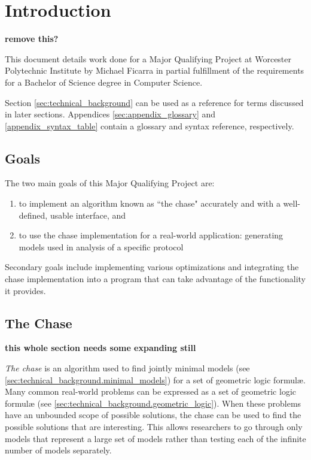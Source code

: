 \section{Introduction}

	\textbf{ remove this? }

	This document details work done for a Major Qualifying Project at Worcester
	Polytechnic Institute by Michael Ficarra in partial fulfillment of the
	requirements for a Bachelor of Science degree in Computer Science.

	Section \ref{sec:technical_background} can be used as a reference for terms
	discussed in later sections. Appendices \ref{sec:appendix_glossary} and
	\ref{appendix_syntax_table} contain a glossary and syntax reference,
	respectively.

	\subsection{Goals}

		The two main goals of this Major Qualifying Project are:

		\begin{enumerate}
		\item to implement an algorithm known as ``the chase" accurately
		and with a well-defined, usable interface, and
		\item to use the chase implementation for a real-world
		application: generating models used in analysis of a specific protocol
		\end{enumerate}

		Secondary goals include implementing various optimizations and
		integrating the chase implementation into a program that can take
		advantage of the functionality it provides.

	\subsection{The Chase}

		\textbf{ this whole section needs some expanding still }

		\emph{The chase} is an algorithm used to find jointly minimal models
		(see \ref{sec:technical_background.minimal_models}) for a set of
		geometric logic formul{\ae}. Many common real-world problems can be
		expressed as a set of geometric logic formul{\ae} (see
		\ref{sec:technical_background.geometric_logic}). When these problems
		have an unbounded scope of possible solutions, the chase can be used to
		find the possible solutions that are interesting. This allows
		researchers to go through only models that represent a large set of
		models rather than testing each of the infinite number of models
		separately.

